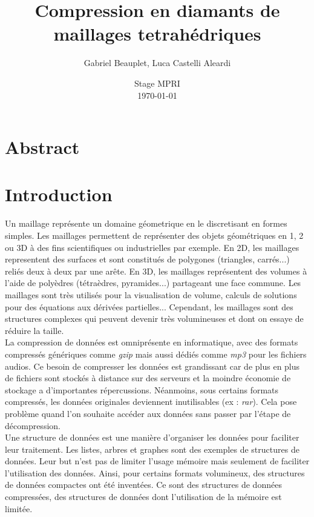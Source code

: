 \documentclass[a4paper,11pt,openany]{article}
\title{Compression en diamants de maillages tetrahédriques}
\author{Gabriel Beauplet, Luca Castelli Aleardi}
\date{%
    Stage MPRI\\%
    \today
}
\begin{document}
\maketitle

\section{Abstract}
\section{Introduction}
\noindent
Un maillage représente un domaine géometrique en le discretisant en formes simples. Les maillages permettent de représenter des objets géométriques en 1, 2 ou 3D à des fins scientifiques ou industrielles par exemple. En 2D, les maillages representent des surfaces et sont constitués de polygones (triangles, carrés...) reliés deux à deux par une arête. En 3D, les maillages représentent des volumes à l'aide de polyèdres (tétraèdres, pyramides...) partageant une face commune. Les maillages sont très utilisés pour la visualisation de volume, calculs de solutions pour des équations aux dérivées partielles... Cependant, les maillages sont des structures complexes qui peuvent devenir très volumineuses et dont on essaye de réduire la taille.\\
La compression de données est omniprésente en informatique, avec des formats compressés génériques comme \textit{gzip} mais aussi dédiés comme \textit{mp3} pour les fichiers audios. Ce besoin de compresser les données est grandissant car de plus en plus de fichiers sont stockés à distance sur des serveurs et la moindre économie de stockage a d'importantes répercussions. Néanmoins, sous certains formats compressés, les données originales deviennent inutilisables (ex : \textit{rar}). Cela pose problème quand l'on souhaite accéder aux données  sans passer par l'étape de décompression.\\
Une structure de données est une manière d'organiser les données pour faciliter leur traitement. Les listes, arbres et graphes sont des exemples de structures de données. Leur but n'est pas de limiter l'usage mémoire mais seulement de faciliter l'utilisation des données. Ainsi, pour certains formats volumineux, des structures de données compactes ont été inventées. Ce sont des structures de données compressées, des structures de données dont l'utilisation de la mémoire est limitée.\\
\end{document}

